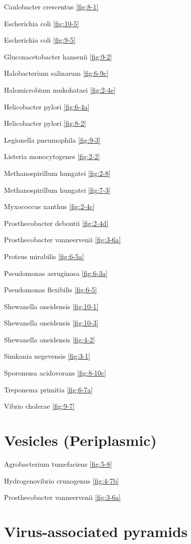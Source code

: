\documentclass[]{tufte-book}
\begin{document}
Caulobacter crescentus \ref{fig:8-1}

Escherichia coli \ref{fig:10-5}

Escherichia coli \ref{fig:9-5}

Gluconacetobacter hansenii \ref{fig:9-2}

Halobacterium salinarum \ref{fig:6-9c}

Halomicrobium mukohataei \ref{fig:2-4e}

Helicobacter pylori \ref{fig:6-4a}

Helicobacter pylori \ref{fig:8-2}

Legionella pneumophila \ref{fig:9-3}

Listeria monocytogenes \ref{fig:2-2}

Methanospirillum hungatei \ref{fig:2-8}

Methanospirillum hungatei \ref{fig:7-3}

Myxococcus xanthus \ref{fig:2-4c}

Prosthecobacter debontii \ref{fig:2-4d}

Prosthecobacter vanneervenii \ref{fig:3-6a}

Proteus mirabilis \ref{fig:6-5a}

Pseudomonas aeruginosa \ref{fig:6-3a}

Pseudomonas flexibilis \ref{fig:6-5}

Shewanella oneidensis \ref{fig:10-1}

Shewanella oneidensis \ref{fig:10-3}

Shewanella oneidensis \ref{fig:4-2}

Simkania negevensis \ref{fig:3-1}

Sporomusa acidovorans \ref{fig:8-10c}

Treponema primitia \ref{fig:6-7a}

Vibrio cholerae \ref{fig:9-7}

\hypertarget{vesicles-periplasmic}{%
\section*{Vesicles (Periplasmic)}\label{vesicles-periplasmic}}

Agrobacterium tumefaciens \ref{fig:5-8}

Hydrogenovibrio crunogenus \ref{fig:4-7b}

Prosthecobacter vanneervenii \ref{fig:3-6a}

\hypertarget{virus-associated-pyramids}{%
\section*{Virus-associated pyramids}\label{virus-associated-pyramids}}
\end{document}
